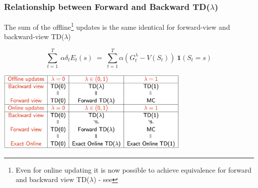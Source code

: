 \documentclass[10pt]{article}
\begin{document}
\subsubsection*{Relationship between Forward and Backward TD($\lambda$)}

The sum of the offline\footnote{Even for online updating it is now possible to achieve equivalence for forward and backward view TD($\lambda$) - see } updates is the same identical for forward-view and backward-view TD($\lambda$)

\begin{equation}
\sum_{t=1}^{T}\:\alpha \delta_{t} E_{t}(s)\;=\;\sum_{t=1}^{T}\alpha (G_{t}^{\lambda} - V(S_{t})) \: \mathbf{1}(S_{t} =s)
\end{equation}
\begin{center}
\includegraphics[width=0.7\textwidth]{pictures/overview_tdl.jpg}
\end{center}
\end{document}
